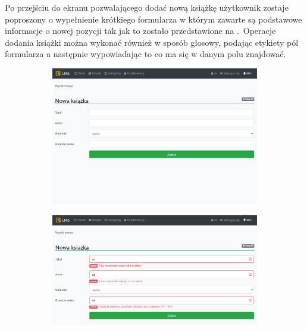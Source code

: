 Po przejściu do ekranu pozwalającego dodać nową książkę użytkownik zostaje poproszony o wypełnienie krótkiego formularza w którym zawarte są podstawowe informacje o nowej pozycji tak jak to zostało przedstawione na .\ Operacje dodania książki można wykonać również w sposób głosowy, podając etykiety pól formularza a następnie wypowiadając to co ma się w danym polu znajdować.


\begin{figure}[H]
    \centering
    \begin{subfigure}[b]{0.4\textwidth}
        \includegraphics[width=\textwidth]{images/addBook}
        \label{fig:addbook}
    \end{subfigure}
    \hfill
    \begin{subfigure}[b]{0.4\textwidth}
        \includegraphics[width=\textwidth]{images/badaddBook}
        \label{fig:addbookbad}
    \end{subfigure}
    \label{fig:book-oooadad}
\end{figure}

